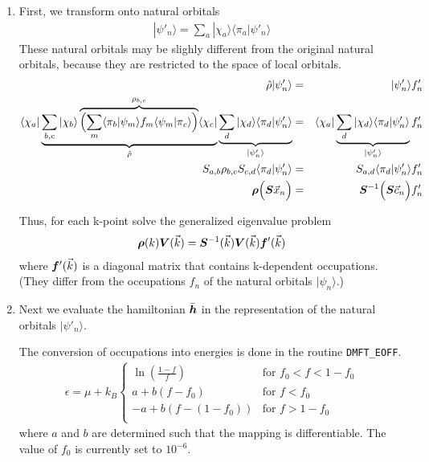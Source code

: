 \documentclass[11pt,a4paper]{report}
\begin{document}
\begin{enumerate}
  \item First, we transform onto natural orbitals 
     \begin{eqnarray}
        |\psi'_n\rangle=\sum_a|\chi_a\rangle \langle\pi_a|\psi'_n\rangle
     \end{eqnarray}
     These natural orbitals may be slighly different from the original
     natural orbitals, because they are restricted to the space of
     local orbitals.
     \begin{eqnarray}
        \hat{\rho}|\psi'_n\rangle&=&|\psi'_n\rangle f'_n
        \nonumber\\
        \langle\chi_a|
        \underbrace{\sum_{b,c}|\chi_b\rangle
        \overbrace{
           \Bigl(\sum_m\langle\pi_b|\psi_m\rangle f_m
                 \langle\psi_m|\pi_c\rangle\Bigr)}^{\rho_{b,c}}
               \langle\chi_c|}_{\hat{\rho}}
             \underbrace{\sum_d|\chi_d\rangle\langle\pi_d|\psi'_n\rangle
              }_{|\psi'_n\rangle}
             &=&
             \langle\chi_a|
             \underbrace{\sum_d|\chi_d\rangle\langle\pi_d|\psi'_n\rangle
              }_{|\psi'_n\rangle} f'_n
     \nonumber\\
           S_{a,b}\rho_{b,c}S_{c,d}\langle\pi_d|\psi'_n\rangle
           &=&S_{a,d}\langle\pi_d|\psi'_n\rangle f'_n
     \nonumber\\
           \bm{\rho} \Bigl(\bm{S} \vec{x}_n\Bigr)
           &=&\bm{S}^{-1}\Bigl(\bm{S} \vec{c}_n\Bigr) f'_n
     \end{eqnarray}

     Thus, for each k-point solve the generalized eigenvalue problem
     \begin{eqnarray*}
        \bm{\rho}(k)\bm{V}(\vec{k})=
        \bm{S}^{-1}(\vec{k})\bm{V}(\vec{k})\bm{f}'(\vec{k})
     \end{eqnarray*}
     where $\bm{f}'(\vec{k})$ is a diagonal matrix that contains
     k-dependent occupations. (They differ from the occupations $f_n$
     of the natural orbitals $|\psi_n\rangle$.)
%
\item Next we evaluate the hamiltonian $\bar{\bm{h}}$ in the
  representation of the natural orbitals $|\psi'_n\rangle$.

  The conversion of occupations into energies is done in the routine
  \verb|DMFT_EOFF|.
  \begin{eqnarray}
  \epsilon=\mu+k_B
  \begin{cases}
  \ln\left(\frac{1-f}{f}\right) &\text{for $f_0<f<1-f_0$}\\
  a+b(f-f_0)&\text{for $f<f_0$}\\
  -a+b(f-(1-f_0))&\text{for $f>1-f_0$}\\
  \end{cases}
  \end{eqnarray}
  where $a$ and $b$ are determined such that the mapping is
  differentiable. The value of $f_0$ is currently set to $10^{-6}$.


\end{enumerate}
\end{document}

